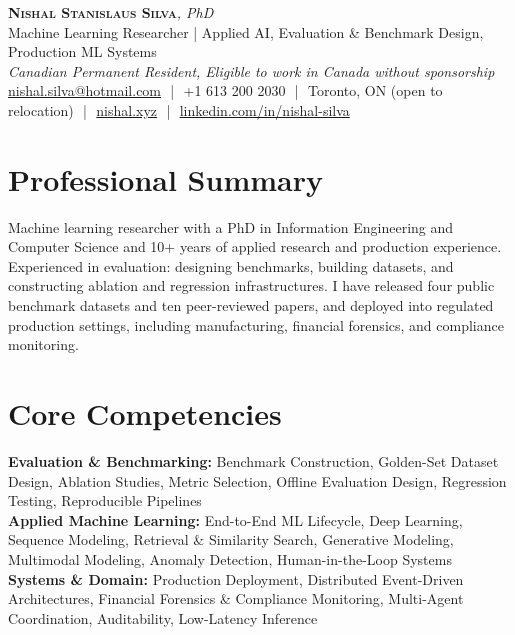 \documentclass[11pt]{article}
\begin{document}
\pagestyle{empty}

\begin{center}
    {\LARGE \scshape \textbf{Nishal Stanislaus Silva}}{\large \textit {, PhD}}
    \\[1pt]
    {\small Machine Learning Researcher | Applied AI, Evaluation \& Benchmark Design, Production ML Systems}
    \\[1pt]
    {\footnotesize\textit{Canadian Permanent Resident, Eligible to work in Canada without sponsorship}}
    \\[1pt]
    {\small
    \href{mailto:nishal.silva@hotmail.com}{nishal.silva@hotmail.com}
    \,\,|\,\, +1 613 200 2030
    \,\,|\,\, Toronto, ON (open to relocation)
    \,\,|\,\, \href{https://nishal.xyz}{nishal.xyz}
    \,\,|\,\, \href{https://www.linkedin.com/in/nishal-silva}{linkedin.com/in/nishal-silva}}
\end{center}

\section*{Professional Summary}

Machine learning researcher with a PhD in Information Engineering and Computer Science and 10+ years of applied research and production experience. Experienced in evaluation: designing benchmarks, building datasets, and constructing ablation and regression infrastructures. I have released four public benchmark datasets and ten peer-reviewed papers, and deployed into regulated production settings, including manufacturing,  financial forensics, and compliance monitoring. 

\section*{Core Competencies}

\textbf{Evaluation \& Benchmarking:} Benchmark Construction, Golden-Set Dataset Design, Ablation Studies, Metric Selection, Offline Evaluation Design, Regression Testing, Reproducible Pipelines\\
\textbf{Applied Machine Learning:} End-to-End ML Lifecycle, Deep Learning, Sequence Modeling, Retrieval \& Similarity Search, Generative Modeling, Multimodal Modeling, Anomaly Detection, Human-in-the-Loop Systems\\
\textbf{Systems \& Domain:} Production Deployment, Distributed Event-Driven Architectures, Financial Forensics \& Compliance Monitoring, Multi-Agent Coordination, Auditability, Low-Latency Inference
\end{document}
